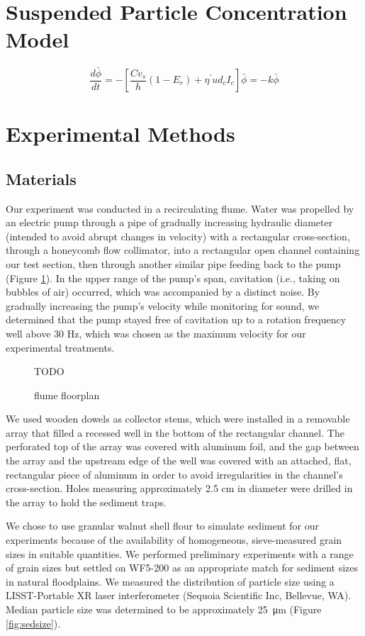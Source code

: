 \documentclass{scrreprt}
\begin{document}
\section{Suspended Particle Concentration Model}

\[\frac{d\bar{\phi}}{dt} = -[\frac{Cv_s}{h}(1-E_r) + \eta^{\prime}ud_cI_c]\bar{\phi} = -k\bar{\phi}\] %

\section{Experimental Methods}

\subsection{Materials}

Our experiment was conducted in a recirculating flume. Water was propelled by an electric pump through a pipe of gradually increasing hydraulic diameter (intended to avoid abrupt changes in velocity) with a rectangular cross-section, through a honeycomb flow collimator, into a rectangular open channel containing our test section, then through another similar pipe feeding back to the pump (Figure \ref{fig:floorplan}). In the upper range of the pump's span, cavitation (i.e., taking on bubbles of air) occurred, which was accompanied by a distinct noise. By gradually increasing the pump's velocity while monitoring for sound, we determined that the pump stayed free of cavitation up to a rotation frequency well above 30 Hz, which was chosen as the maximum velocity for our experimental treatments.

\begin{figure}[htbp]
TODO
\centering
\caption{flume floorplan}
\label{fig:floorplan}
\end{figure}

We used wooden dowels as collector stems, which were installed in a removable array that filled a recessed well in the bottom of the rectangular channel. The perforated top of the array was covered with aluminum foil, and the gap between the array and the upstream edge of the well was covered with an attached, flat, rectangular piece of aluminum in order to avoid irregularities in the channel's cross-section. Holes measuring approximately 2.5 cm in diameter were drilled in the array to hold the sediment traps.

We chose to use granular walnut shell flour to simulate sediment for our experiments because of the availability of homogeneous, sieve-measured grain sizes in suitable quantities. We performed preliminary experiments with a range of grain sizes but settled on WF5-200 as an appropriate match for sediment sizes in natural floodplains. We measured the distribution of particle size using a LISST-Portable XR laser interferometer (Sequoia Scientific Inc, Bellevue, WA). Median particle size was determined to be approximately \SI{25}{\micro\metre} (Figure \ref{fig:sedsize}).
\end{document}
